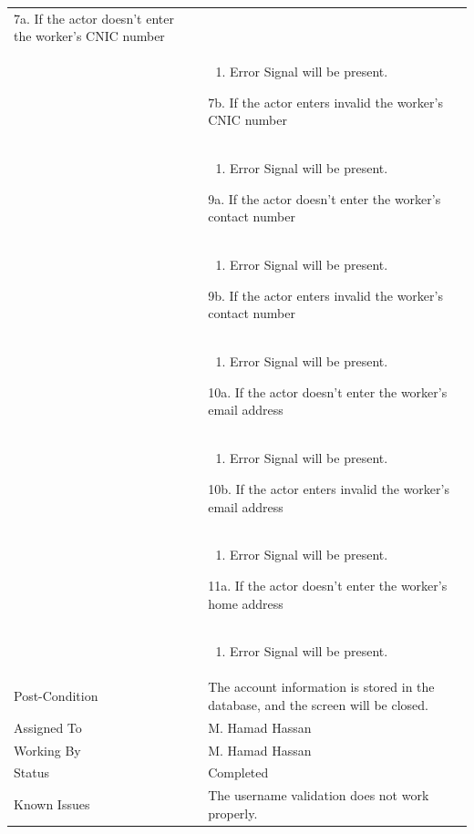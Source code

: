 \documentclass[12pt,a4paper]{article}
\begin{document}
\begin{longtable}{| p{3cm}|p{12cm}|}
7a. If the actor doesn't enter the worker's CNIC number\\ 	
&	\begin{enumerate}
		\item Error Signal will be present.
	\end{enumerate}
7b. If the actor enters invalid the worker's CNIC number\\ 	
&	\begin{enumerate}
		\item Error Signal will be present.
	\end{enumerate}
9a. If the actor doesn't enter the worker's contact number\\ 	
&	\begin{enumerate}
		\item Error Signal will be present.
	\end{enumerate}
9b. If the actor enters invalid the worker's contact number\\ 	
&	\begin{enumerate}
		\item Error Signal will be present.
	\end{enumerate}
10a. If the actor doesn't enter the worker's email address\\ 	
&	\begin{enumerate}
		\item Error Signal will be present.
	\end{enumerate}
10b. If the actor enters invalid the worker's email address\\ 	
&	\begin{enumerate}
		\item Error Signal will be present.
	\end{enumerate}
11a. If the actor doesn't enter the worker's home address\\ 	
&	\begin{enumerate}
		\item Error Signal will be present.
	\end{enumerate}
\\ \hline
Post-Condition & The account information is stored in the database, and the screen will be closed. \\\hline
Assigned To &  M. Hamad Hassan
\\ \hline
Working By &    M. Hamad Hassan
\\ \hline
Status & 	Completed	
\\ \hline
Known Issues & The username validation does not work properly. 
\\\hline
\end{longtable}
\end{document}
